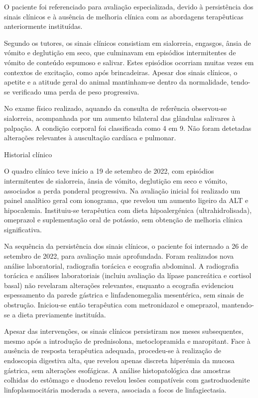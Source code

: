 O paciente foi referenciado para avaliação especializada, devido à persistência dos sinais clínicos e à ausência de melhoria clínica com as abordagens terapêuticas anteriormente instituídas.


Segundo os tutores, os sinais clínicos consistiam em sialorreia, engasgos, ânsia de vómito e deglutição em seco, que culminavam em episódios intermitentes de vómito de conteúdo espumoso e salivar. Estes episódios ocorriam muitas vezes em contextos de excitação, como após brincadeiras. Apesar dos sinais clínicos, o apetite e a atitude geral do animal mantinham-se dentro da normalidade, tendo-se verificado uma perda de peso progressiva.


No exame físico realizado, aquando da consulta de referência observou-se sialorreia, acompanhada por um aumento bilateral das glândulas salivares à palpação. A condição corporal foi classificada como 4 em 9. Não foram detetadas alterações relevantes à auscultação cardíaca e pulmonar.

Historial clínico


O quadro clínico teve início a 19 de setembro de 2022, com episódios intermitentes de sialorreia, ânsia de vómito, deglutição em seco e vómito, associados a perda ponderal progressiva. Na avaliação inicial foi realizado um painel analítico geral com ionograma, que revelou um aumento ligeiro da ALT e hipocalemia. Instituiu-se terapêutica com dieta hipoalergénica (ultrahidrolisada), omeprazol e suplementação oral de potássio, sem obtenção de melhoria clínica significativa.


Na sequência da persistência dos sinais clínicos, o paciente foi internado a 26 de setembro de 2022, para avaliação mais aprofundada. Foram realizados nova análise laboratorial, radiografia torácica e ecografia abdominal. A radiografia torácica e análises laboratoriais (incluiu avaliação da lípase pancreática e cortisol basal) não revelaram alterações relevantes, enquanto a ecografia evidenciou espessamento da parede gástrica e linfadenomegalia mesentérica, sem sinais de obstrução. Iniciou-se então terapêutica com metronidazol e omeprazol, mantendo-se a dieta previamente instituída.


Apesar das intervenções, os sinais clínicos persistiram nos meses subsequentes, mesmo após a introdução de prednisolona, metoclopramida e maropitant. Face à ausência de resposta terapêutica adequada, procedeu-se à realização de endoscopia digestiva alta, que revelou apenas discreta hiperémia da mucosa gástrica, sem alterações esofágicas.  A análise histopatológica das amostras colhidas do estômago e duodeno revelou lesões compatíveis com gastroduodenite linfoplasmocitária moderada a severa, associada a focos de linfagiectasia. 



